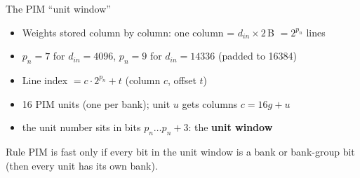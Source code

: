 \documentclass[aspectratio=169,10pt]{beamer}
\begin{document}
\begin{frame}{The PIM ``unit window''}
\begin{itemize}
\item Weights stored column by column: one column = $d_{in}\times 2$\,B $= 2^{p_n}$ lines
\item[] $p_n = 7$ for $d_{in}=4096$, \quad $p_n = 9$ for $d_{in}=14336$ (padded to 16384)
\item Line index $= c \cdot 2^{p_n} + t$ \quad (column $c$, offset $t$)
\item 16 PIM units (one per bank); unit $u$ gets columns $c = 16g + u$
\item[$\Rightarrow$] the unit number sits in bits $p_n \ldots p_n{+}3$: the \textbf{unit window}
\end{itemize}
\vspace{4mm}
\begin{block}{Rule}
PIM is fast only if every bit in the unit window is a bank or bank-group bit
(then every unit has its own bank).
\end{block}
\end{frame}
\end{document}
